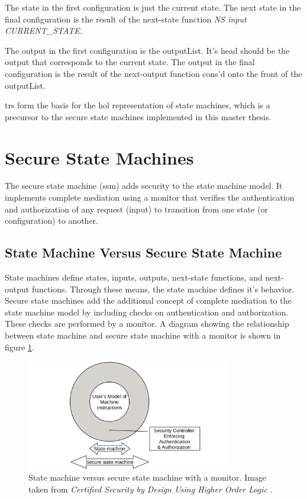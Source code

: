 \documentclass[../../main/main.tex]{subfiles}
\begin{document}
The state in the first configuration is just the current state.  The next state in the final configuration is the result of the next-state function \textit{NS input CURRENT_STATE}.

The output in the first configuration is the outputList.  It's head should be the output that corresponds to the current state.  The output in the final configuration is the result of the next-output function cons'd onto the front of the outputList.

\glspl{tr} form the basis for the \gls{hol} representation of state machines, which is a precursor to the secure state machines implemented in this master thesis.  


\section{Secure State Machines}\label{sec:ssm}
The secure state machine (\gls{ssm}) adds security to the state machine model.  It implements complete mediation using a monitor that verifies the authentication and authorization of any request (input) to transition from one state (or configuration) to another.   

\subsection{State Machine Versus Secure State Machine}
State machines define states, inputs, outputs, next-state functions, and next-output functions.  Through these means, the state machine defines it's behavior.  Secure state machines add the additional concept of complete mediation to the state machine model by including checks on authentication and authorization.  These checks are performed by a monitor.  A diagram showing the relationship between state machine and secure state machine with a monitor is shown in figure \ref{smVSssm}.  

\begin{figure}[!h!]
\centering
\includegraphics[width=0.8\textwidth]{../figures/smVSssm}
\caption{\label{smVSssm} State machine versus secure state machine with a monitor.  Image taken from \textit{Certified Security by Design Using Higher Order Logic} \cite{certmanual}.}
\end{figure}
\end{document}
